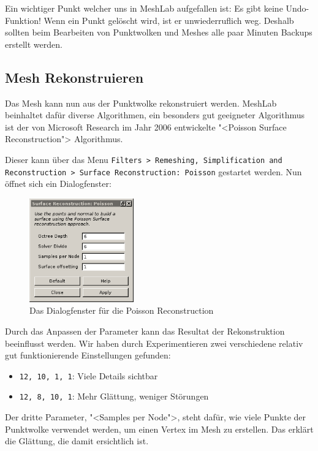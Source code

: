 Ein wichtiger Punkt welcher uns in MeshLab aufgefallen ist: Es gibt keine
Undo-Funktion! Wenn ein Punkt gelöscht wird, ist er unwiederruflich weg.
Deshalb sollten beim Bearbeiten von Punktwolken und Meshes alle paar Minuten
Backups erstellt werden.

\subsection{Mesh Rekonstruieren}

Das Mesh kann nun aus der Punktwolke rekonstruiert werden. MeshLab beinhaltet
dafür diverse Algorithmen, ein besonders gut geeigneter Algorithmus ist der von
Microsoft Research im Jahr 2006 entwickelte "<Poisson Surface
Reconstruction">\cite{kazhdan:2006} Algorithmus.

Dieser kann über das Menu \texttt{Filters > Remeshing, Simplification and
Reconstruction > Surface Reconstruction: Poisson} gestartet werden. Nun öffnet
sich ein Dialogfenster:

\begin{figure}[H]
	\centering
	\includegraphics[width=0.4\textwidth]{images/poisson_dialog.png}
	\caption{Das Dialogfenster für die Poisson Reconstruction}
	\label{img:meshlab_poisson_dialog}
\end{figure}

Durch das Anpassen der Parameter kann das Resultat der Rekonstruktion
beeinflusst werden. Wir haben durch Experimentieren zwei verschiedene
relativ gut funktionierende Einstellungen gefunden:

\begin{itemize}
	\item \texttt{12, 10, 1, 1}: Viele Details sichtbar
	\item \texttt{12, 8, 10, 1}: Mehr Glättung, weniger Störungen
\end{itemize}

Der dritte Parameter, "<Samples per Node">, steht dafür, wie viele Punkte der
Punktwolke verwendet werden, um einen Vertex im Mesh zu erstellen. Das erklärt
die Glättung, die damit ersichtlich ist.

